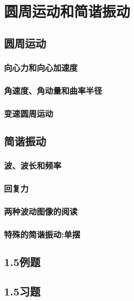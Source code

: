 \section{圆周运动和简谐振动}
\subsection{圆周运动}
\subsubsection{向心力和向心加速度}
\subsubsection{角速度、角动量和曲率半径}
\subsubsection{变速圆周运动}
\subsection{简谐振动}
\subsubsection{波、波长和频率}
\subsubsection{回复力}
\subsubsection{两种波动图像的阅读}
\subsubsection{特殊的简谐振动:单摆}
\subsection{1.5例题}
\subsection{1.5习题}